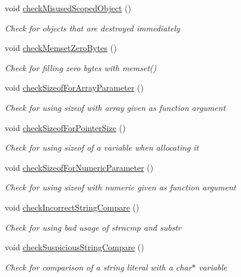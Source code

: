 \begin{DoxyCompactItemize}
void \hyperlink{class_check_other_adfbde85a587e0da9ad55909f9b7351fe}{check\-Misused\-Scoped\-Object} ()
\begin{DoxyCompactList}\small\item\em Check for objects that are destroyed immediately \end{DoxyCompactList}\item 
void \hyperlink{class_check_other_a96c2f87cfb86f2fe4b54797b12c5d1ac}{check\-Memset\-Zero\-Bytes} ()
\begin{DoxyCompactList}\small\item\em Check for filling zero bytes with memset() \end{DoxyCompactList}\item 
void \hyperlink{class_check_other_a57bb9236b24dfe177c5c2fa2d4aaf334}{check\-Sizeof\-For\-Array\-Parameter} ()
\begin{DoxyCompactList}\small\item\em Check for using sizeof with array given as function argument \end{DoxyCompactList}\item 
void \hyperlink{class_check_other_a9845494a7f1adf15cfc72c3155dfb281}{check\-Sizeof\-For\-Pointer\-Size} ()
\begin{DoxyCompactList}\small\item\em Check for using sizeof of a variable when allocating it \end{DoxyCompactList}\item 
void \hyperlink{class_check_other_a25e206a096e671b00ce75e26a6fd8810}{check\-Sizeof\-For\-Numeric\-Parameter} ()
\begin{DoxyCompactList}\small\item\em Check for using sizeof with numeric given as function argument \end{DoxyCompactList}\item 
void \hyperlink{class_check_other_a8653c3f990e15c739cd9198082892f6b}{check\-Incorrect\-String\-Compare} ()
\begin{DoxyCompactList}\small\item\em Check for using bad usage of strncmp and substr \end{DoxyCompactList}\item 
void \hyperlink{class_check_other_a7bba4f179cf90a3468a97dc2da10f47a}{check\-Suspicious\-String\-Compare} ()
\begin{DoxyCompactList}\small\item\em Check for comparison of a string literal with a char$\ast$ variable \end{DoxyCompactList}\item 

\end{DoxyCompactItemize}
